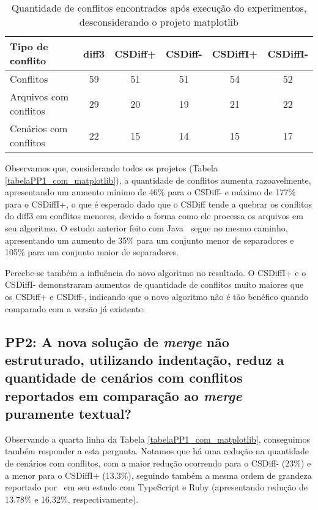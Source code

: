 \begin{table}[ht]
	\begin{center}
		\begin{tabular}{|l|c|c|c|c|c|}
			\hline
			\textbf{Tipo de conflito} & \textbf{diff3} & \textbf{CSDiff+} & \textbf{CSDiff-} & \textbf{CSDiffI+} & \textbf{CSDiffI-} \\
			\hline
			Conflitos                 & 59             & 51               & 51               & 54                & 52                \\
			Arquivos com conflitos    & 29             & 20               & 19               & 21                & 22                \\
			Cenários com conflitos    & 22             & 15               & 14               & 15                & 17                \\
			\hline
		\end{tabular}
	\end{center}
	\caption{Quantidade de conflitos encontrados após execução do experimentos, desconsiderando o
		projeto matplotlib}\label{tabelaPP1_sem_matplotlib}
\end{table}

Observamos que, considerando todos os projetos (Tabela \ref{tabelaPP1_com_matplotlib}), a quantidade de conflitos aumenta
razoavelmente, apresentando um aumento mínimo de 46\% para o CSDiff- e máximo de 177\% para o CSDiffI+, o que é esperado dado que o
CSDiff tende a quebrar os conflitos do diff3 em conflitos menores, devido a forma como ele processa os arquivos em seu algoritmo.
O estudo anterior feito com Java~\cite{clem21} segue no mesmo caminho, apresentando um aumento de 35\% para um conjunto menor de
separadores e 105\% para um conjunto maior de separadores.

Percebe-se também a influência do novo algoritmo no resultado. O CSDiffI+ e o CSDiffI- demonstraram aumentos de quantidade de
conflitos muito maiores que os CSDiff+ e CSDiff-, indicando que o novo algoritmo não é tão benéfico quando comparado com a
versão já existente.

\subsection{PP2: A nova solução de \emph{merge} não estruturado, utilizando indentação,
	reduz a quantidade de cenários com conflitos reportados em comparação ao \emph{merge} puramente textual?}\label{resultado_pp2}
Observando a quarta linha da Tabela \ref{tabelaPP1_com_matplotlib}, conseguimos também responder a esta pergunta. Notamos
que há uma redução na quantidade de cenários com conflitos, com a maior redução ocorrendo para o CSDiff- (23\%) e a menor para o
CSDiffI+ (13.3\%), seguindo também a mesma ordem de grandeza reportado por~\citeauthor{heitor21} em seu estudo com TypeScript
e Ruby (apresentando redução de 13.78\% e 16.32\%, respectivamente).

